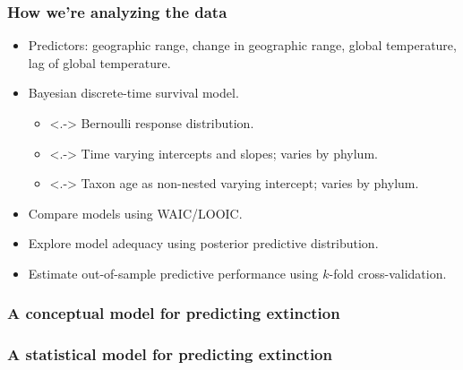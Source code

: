 \documentclass{beamer}
\begin{document}
\begin{frame}
  \frametitle{How we're analyzing the data}

  \begin{itemize}[<+->]
    \item Predictors: geographic range, change in geographic range, global temperature, lag of global temperature.
    \item Bayesian discrete-time survival model.
      \begin{itemize}
        \item<.-> Bernoulli response distribution.
        \item<.-> Time varying intercepts and slopes; varies by phylum.
        \item<.-> Taxon age as non-nested varying intercept; varies by phylum.
      \end{itemize}
    \item \alert{Compare} models using WAIC/LOOIC.
    \item Explore model \alert{adequacy} using posterior predictive distribution.
    \item Estimate out-of-sample \alert{predictive performance} using \(k\)-fold cross-validation.
  \end{itemize}

\end{frame}


\begin{frame}
  \frametitle{A conceptual model for predicting extinction}

\end{frame}


\begin{frame}
  \frametitle{A statistical model for predicting extinction}

\end{frame}
\end{document}
